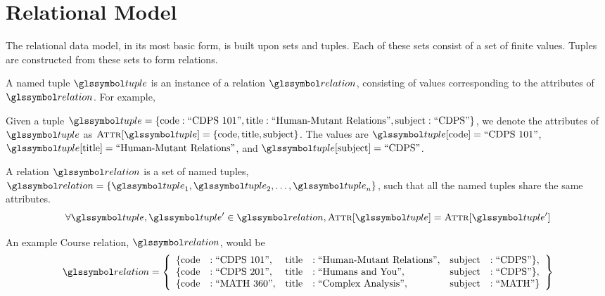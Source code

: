 \section{Relational Model}
	The relational data model, in its most basic form, is built upon sets and tuples.  Each of these sets consist of a set of finite values.  Tuples are constructed from these sets to form relations.
	
	\begin{defn}
	\label{def:named-tuple}
		A named tuple \(\tuple\) is an instance of a relation \(\relation\), consisting of values corresponding to the attributes of \(\relation\).  For example,
	\end{defn}
	
	\begin{ex}
		Given a tuple \(\tuple = \{\text{code}: \text{``CDPS 101''}, \text{title}: \text{``Human-Mutant Relations''}, \text{subject}: \text{``CDPS''}\}\), we denote the attributes of \(\tuple\) as \(\attributes{\tuple} = \{\text{code}, \text{title}, \text{subject}\}\).  The values are \(\tuple\lbrack\text{code}\rbrack = \text{``CDPS 101''}\), \(\tuple\lbrack\text{title}\rbrack = \text{``Human-Mutant Relations''}\), and \(\tuple\lbrack\text{subject}\rbrack = \text{``CDPS''}\).
	\end{ex}
	
	\begin{defn}[Relation]
	\label{def:relation}
		A relation \(\relation\) is a set of named tuples, \(\relation = \{\tuple_1, \tuple_2, \dotsc, \tuple_n\}\), such that all the named tuples share the same attributes.
		\begin{equation}
			\forall \tuple, \tuple' \in \relation, \attributes{\tuple} = \attributes{\tuple'}
		\end{equation}
	\end{defn}
	
	\begin{ex}
	\label{ex:relation}
		An example Course relation, \(\relation\), would be
		\[
			\relation = \left\{
				\begin{array}{llllll}
					\{\text{code} &: \text{``CDPS 101''}, &\text{title} &: \text{``Human-Mutant Relations''}, &\text{subject} &: \text{``CDPS''}\}, \\
					\{\text{code} &: \text{``CDPS 201''}, &\text{title} &: \text{``Humans and You''}, &\text{subject} &: \text{``CDPS''}\}, \\
					\{\text{code} &: \text{``MATH 360''}, &\text{title} &: \text{``Complex Analysis''}, &\text{subject} &: \text{``MATH''}\}
				\end{array}
			\right\}
		\]
	\end{ex}
		
